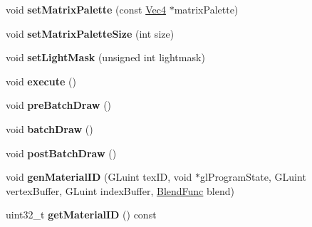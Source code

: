 \begin{DoxyCompactItemize}
\item 
\mbox{\label{classMeshCommand_ac14323dc333b9f0ffb4905dfcd4f72c8}} 
void {\bfseries set\+Matrix\+Palette} (const \hyperlink{classVec4}{Vec4} $\ast$matrix\+Palette)
\item 
\mbox{\label{classMeshCommand_a63f2a151e3f5729875b2b81db60f0de9}} 
void {\bfseries set\+Matrix\+Palette\+Size} (int size)
\item 
\mbox{\label{classMeshCommand_a1e220119395615b722417accd54f930d}} 
void {\bfseries set\+Light\+Mask} (unsigned int lightmask)
\item 
\mbox{\label{classMeshCommand_a150b126cc1cc72af1b77fa776eab0535}} 
void {\bfseries execute} ()
\item 
\mbox{\label{classMeshCommand_a3a188b7afec903df212669edfcede1e6}} 
void {\bfseries pre\+Batch\+Draw} ()
\item 
\mbox{\label{classMeshCommand_ad597c5e7a60681a67b60921572e9b087}} 
void {\bfseries batch\+Draw} ()
\item 
\mbox{\label{classMeshCommand_a8fc2a01a7690084becbd553d17bd6011}} 
void {\bfseries post\+Batch\+Draw} ()
\item 
\mbox{\label{classMeshCommand_a5d25a18af7f89d6fc009d0c28873a8f6}} 
void {\bfseries gen\+Material\+ID} (G\+Luint tex\+ID, void $\ast$gl\+Program\+State, G\+Luint vertex\+Buffer, G\+Luint index\+Buffer, \hyperlink{structBlendFunc}{Blend\+Func} blend)
\item 
\mbox{\label{classMeshCommand_a9cf680774d0c105715d6d7a11e1d2e30}} 
uint32\+\_\+t {\bfseries get\+Material\+ID} () const
\end{DoxyCompactItemize}
